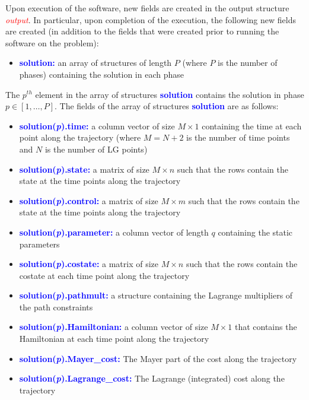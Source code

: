 \documentclass[10pt,final]{report}
\newcommand{\bfblue}[1]{\textcolor{blue}{\bf #1}}
\newcommand{\slred}[1]{\textcolor{red}{\sl #1}}
\begin{document}
Upon execution of the software, new fields are created in the output structure
\slred{output}.  In particular, upon completion of the execution, the following new fields are created (in addition to the fields
that were created prior to running the software on the problem):
\begin{itemize}
  \item \bfblue{solution:}  an array of structures of length $P$
    (where $P$ is the number of phases) containing the solution in each phase
\end{itemize}
The $p^{th}$ element in the array of structures \bfblue{solution}
contains the solution in phase $p\in[1,\ldots,P]$.  The fields of the
array of structures \bfblue{solution} are as follows:
\begin{itemize}
  \item \bfblue{solution(\textit{p}).time:} a column vector of size $M\times 1$
    containing the time at each point along the trajectory (where
    $M=N+2$ is the number of time points and $N$ is the number of LG points)
  \item  \bfblue{solution(\textit{p}).state:}  a matrix of size $M\times n$ such
    that the rows contain the state at the time points along the trajectory
  \item \bfblue{solution(\textit{p}).control:}  a matrix of size $M\times m$ such that the
    rows contain the state at the time points along the trajectory
  \item \bfblue{solution(\textit{p}).parameter:}  a column vector of length $q$
    containing the static parameters
  \item  \bfblue{solution(\textit{p}).costate:}  a matrix of size $M\times n$ such
    that the rows contain the costate at each time point along the trajectory
  \item \bfblue{solution(\textit{p}).pathmult:}  a structure containing the Lagrange
    multipliers of the path constraints
  \item  \bfblue{solution(\textit{p}).Hamiltonian:}  a column vector of size $M\times 1$
    that contains the Hamiltonian at each time point along the trajectory
  \item  \bfblue{solution(\textit{p}).Mayer\_cost:}  The Mayer part of the cost along the trajectory
  \item  \bfblue{solution(\textit{p}).Lagrange\_cost:}  The Lagrange (integrated) cost along the trajectory
\end{itemize}
\end{document}
